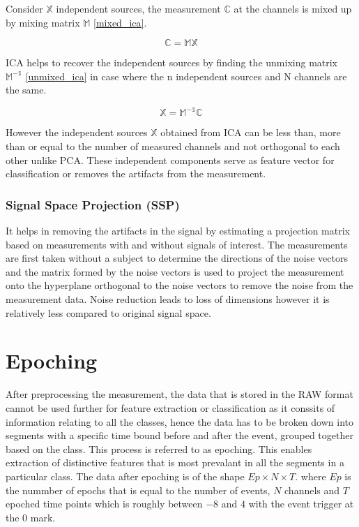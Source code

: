Consider $\mathbb{X}$ independent sources, the measurement $\mathbb{C}$ at the channels is mixed up by mixing matrix $\mathbb{M}$ \ref{mixed_ica}.

\begin{equation} \label{eq:mixed_ica}
    \mathbb{C} = \mathbb{MX} 
\end{equation}

ICA helps to recover the independent sources by finding the unmixing matrix  $\mathbb{M^{-1}}$ \ref{unmixed_ica} in case where the n independent sources and N channels are the same.

\begin{equation} \label{eq:unmixed_ica}
    \mathbb{X} = \mathbb{M^{-1}C}
\end{equation}

However the independent sources $\mathbb{X}$ obtained from ICA can be less than, more than or equal to the number of measured channels and not orthogonal to each other unlike PCA. These independent components serve as feature vector for classification or removes the artifacts from the measurement.

\subsubsection{Signal Space Projection (SSP)}
It helps in removing the artifacts in the signal by estimating a projection matrix based on measurements with and without signals of interest. The measurements are first taken without a subject to determine the directions of the noise vectors and the matrix formed by the noise vectors is used to project the measurement onto the hyperplane orthogonal to the noise vectors to remove the noise from the measurement data. Noise reduction leads to loss of dimensions however it is relatively less compared to original signal space.  

\section{Epoching}
After preprocessing the measurement, the data that is stored in the RAW format cannot be used further for feature extraction or classification as it conssits of information relating to all the classes, hence the data has to be broken down into segments with a specific time bound before and after the event, grouped together based on the class. This process is referred to as epoching. This enables extraction of distinctive features that is most prevalant in all the segments in a particular class. The data after epoching is of the shape $Ep \times N \times T$. where  $Ep$ is the nummber of epochs that is equal to the number of events, $N$ channels and $T$ epoched time points which is roughly between
$-8$ and $4$ with the event trigger at the $0$ mark.

